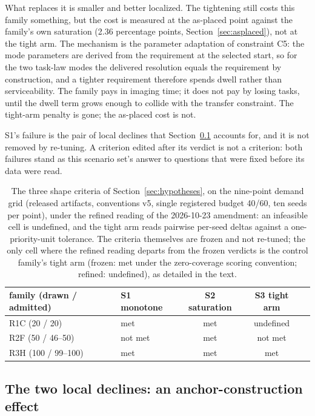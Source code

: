 \documentclass[preprint,authoryear]{elsarticle}
\begin{document}
What replaces it is smaller and better localized. The tightening still costs this family something, but the cost is measured at the as-placed point against the family's own saturation (2.36 percentage points, Section~\ref{sec:asplaced}), not at the tight arm. The mechanism is the parameter adaptation of constraint C5: the mode parameters are derived from the requirement at the selected start, so for the two task-law modes the delivered resolution equals the requirement by construction, and a tighter requirement therefore spends dwell rather than serviceability. The family pays in imaging time; it does not pay by losing tasks, until the dwell term grows enough to collide with the transfer constraint. The tight-arm penalty is gone; the as-placed cost is not.

S1's failure is the pair of local declines that Section~\ref{sec:dip} accounts for, and it is not removed by re-tuning. A criterion edited after its verdict is not a criterion: both failures stand as this scenario set's answer to questions that were fixed before its data were read.

\begin{table}[t]
\centering
\caption{The three shape criteria of Section~\ref{sec:hypotheses}, on the nine-point demand grid (released artifacts, conventions v5, single registered budget 40/60, ten seeds per point), under the refined reading of the 2026-10-23 amendment: an infeasible cell is undefined, and the tight arm reads pairwise per-seed deltas against a one-priority-unit tolerance. The criteria themselves are frozen and not re-tuned; the only cell where the refined reading departs from the frozen verdicts is the control family's tight arm (frozen: met under the zero-coverage scoring convention; refined: undefined), as detailed in the text.}
\label{tab:criteria}
\begin{tabular}{llccc}
\toprule
family (drawn / admitted) & S1 monotone & S2 saturation & S3 tight arm \\
\midrule
R1C (20 / 20) & met         & met     & undefined \\
R2F (50 / 46--50) & not met     & met     & not met \\
R3H (100 / 99--100) & met         & met     & met \\
\bottomrule
\end{tabular}
\end{table}

\subsection{The two local declines: an anchor-construction effect}\label{sec:dip}
\end{document}
